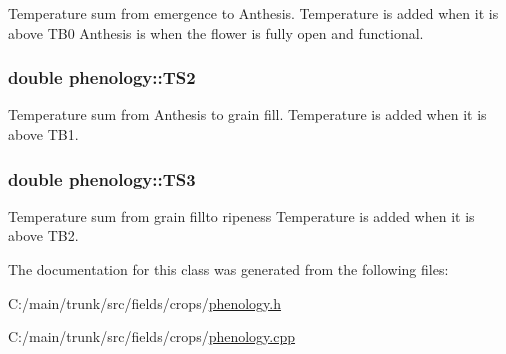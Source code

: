 Temperature sum from emergence to Anthesis. Temperature is added when it is above TB0 Anthesis is when the flower is fully open and functional. \hypertarget{classphenology_a40890cc0269344ac78c0d3f0e09db107}{
\subsubsection[{TS2}]{\setlength{\rightskip}{0pt plus 5cm}double {\bf phenology::TS2}}}
\label{classphenology_a40890cc0269344ac78c0d3f0e09db107}


Temperature sum from Anthesis to grain fill. Temperature is added when it is above TB1. \hypertarget{classphenology_afd6b3084c34fa451055bebb7300a23a3}{
\subsubsection[{TS3}]{\setlength{\rightskip}{0pt plus 5cm}double {\bf phenology::TS3}}}
\label{classphenology_afd6b3084c34fa451055bebb7300a23a3}


Temperature sum from grain fillto ripeness Temperature is added when it is above TB2. 

The documentation for this class was generated from the following files:\begin{DoxyCompactItemize}
\item 
C:/main/trunk/src/fields/crops/\hyperlink{phenology_8h}{phenology.h}\item 
C:/main/trunk/src/fields/crops/\hyperlink{phenology_8cpp}{phenology.cpp}\end{DoxyCompactItemize}

